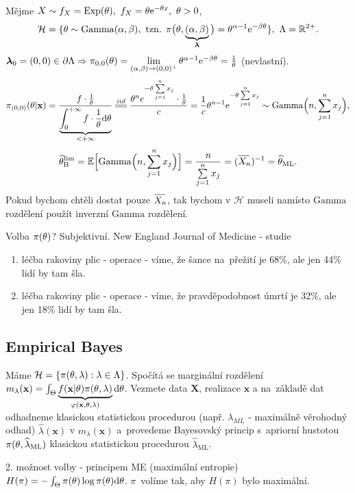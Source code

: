 \begin{example}
	Mějme $X\sim f_X=\mathrm{Exp}(\theta),~f_X=\theta\mathrm{e}^{-\theta x},~\theta>0$, $$\mathcal{H}=\{\theta\sim\mathrm{Gamma}(\alpha,\beta),~\text{tzn. }\pi\big(\theta,\underbrace{(\alpha,\beta)}_{\boldsymbol{\lambda}}\big)=\theta^{\alpha-1}\mathrm{e}^{-\beta\theta}\},~\Lambda=\mathbb{R}^{2+}.$$ $\boldsymbol{\lambda}_0=(0,0)\in\partial\Lambda\Rightarrow\pi_{0,0}(\theta)=\lim\limits_{(\alpha,\beta)\to(0,0)^{+}}\theta^{\alpha-1}\mathrm{e}^{-\beta\theta}=\frac{1}{\theta}$ (nevlastní).
	$$\pi_{(0,0)}(\t|\textbf{x})=\frac{f\cdot\frac{1}{\t}}{\underbrace{\int_{0}^{+\infty}f\cdot\frac{1}{\t}\d\t}_{<+\infty}}\equal{iid}\frac{\t^n e^{-\t\sumjn x_j}\cdot\frac{1}{\t}}{c}=\frac{1}{c}\t^{n-1}\e{-\t\sumjn x_j}\sim\mathrm{Gamma}\Big(n,\sumjn x_j\Big),$$
	$$\htb^{\mathrm{lim}}=\E\Big[\mathrm{Gamma}\Big(n,\sumjn x_j\Big)\Big]=\frac{n}{\sumjn x_j}=\inv{(\Oxn)}=\html.$$
	Pokud bychom chtěli dostat pouze $\Oxn$, tak bychom v $\mathcal{H}$ museli namísto $\mathrm{Gamma}$ rozdělení použít inverzní $\mathrm{Gamma}$ rozdělení.
\end{example}
\begin{example}
	Volba $\pi(\theta)$? Subjektivní. New England Journal of Medicine - studie\begin{enumerate}[1)]
		\item léčba rakoviny plic - operace - víme, že šance na~přežití je 68\%, ale jen 44\% lidí by tam šla. 
		\item léčba rakoviny plic - operace - víme, že pravděpodobnost úmrtí je 32\%, ale jen 18\% lidí by tam šla. 
	\end{enumerate}
\end{example}

\subsection{Empirical Bayes}
Máme $\mathcal{H}=\{\pi(\theta,\lambda):\lambda\in\Lambda\}$. Spočítá se marginální rozdělení $m_\lambda(\textbf{x})=\int_\Theta\underbrace{f(\textbf{x}|\theta)\pi(\theta,\lambda)}_{\varphi(\textbf{x},\theta,\lambda)}\mathrm{d}\theta$. Vezmete data $\textbf{X}$, realizace $\textbf{x}$ a  na~základě dat odhadneme klasickou statistickou procedurou (např. $\lambda_{ML}$ - maximálně věrohodný odhad) $\widehat{\lambda}(\textbf{x})$ v $m_\lambda(\textbf{x})$ a~provedeme Bayesovský princip s~apriorní hustotou $\pi(\theta,\widehat{\lambda}_{\mathrm{ML}})$ klasickou statistickou procedurou $\widehat{\lambda}_{\mathrm{ML}}$.

2. možnost volby - principem ME (maximální entropie) $H(\pi)=-\int_\Theta\pi(\theta)\log \pi(\theta)\mathrm{d}\theta$. $\pi$~volíme tak, aby $H(\pi)$ bylo maximální.

